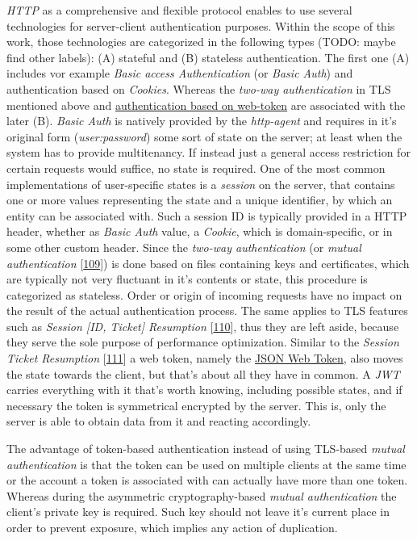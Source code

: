 \documentclass[12pt,english,a4paper,titlepage,cleardoublepage=empty,dottedtoc]{report}
\begin{document}
\emph{HTTP} as a comprehensive and flexible protocol enables to use
several technologies for server-client authentication purposes. Within
the scope of this work, those technologies are categorized in the
following types (TODO: maybe find other labels): (A) stateful and (B)
stateless authentication. The first one (A) includes vor example
\emph{Basic access Authentication} (or \emph{Basic Auth}) and
authentication based on \emph{Cookies}. Whereas the \emph{two-way
authentication} in TLS mentioned above and
\protect\hyperlink{link_jwt}{authentication based on web-token} are
associated with the later (B). \emph{Basic Auth} is natively provided by
the \emph{http-agent} and requires in it's original form
(\emph{user:password}) some sort of state on the server; at least when
the system has to provide multitenancy. If instead just a general access
restriction for certain requests would suffice, no state is required.
One of the most common implementations of user-specific states is a
\emph{session} on the server, that contains one or more values
representing the state and a unique identifier, by which an entity can
be associated with. Such a session ID is typically provided in a HTTP
header, whether as \emph{Basic Auth} value, a \emph{Cookie}, which is
domain-specific, or in some other custom header. Since the \emph{two-way
authentication} (or \emph{mutual authentication}
{[}\protect\hyperlink{ref-web_2017_wikipedia_mutual-auth}{109}{]}) is
done based on files containing keys and certificates, which are
typically not very fluctuant in it's contents or state, this procedure
is categorized as stateless. Order or origin of incoming requests have
no impact on the result of the actual authentication process. The same
applies to TLS features such as \emph{Session {[}ID, Ticket{]}
Resumption}
{[}\protect\hyperlink{ref-book_2013_networking-101_tls-session-resumption}{110}{]},
thus they are left aside, because they serve the sole purpose of
performance optimization. Similar to the \emph{Session Ticket
Resumption}
{[}\protect\hyperlink{ref-web_spec_tls-session-ticket-resumption}{111}{]}
a web token, namely the \protect\hyperlink{link_jwt}{JSON Web Token},
also moves the state towards the client, but that's about all they have
in common. A \emph{JWT} carries everything with it that's worth knowing,
including possible states, and if necessary the token is symmetrical
encrypted by the server. This is, only the server is able to obtain data
from it and reacting accordingly.

The advantage of token-based authentication instead of using TLS-based
\emph{mutual authentication} is that the token can be used on multiple
clients at the same time or the account a token is associated with can
actually have more than one token. Whereas during the asymmetric
cryptography-based \emph{mutual authentication} the client's private key
is required. Such key should not leave it's current place in order to
prevent exposure, which implies any action of duplication.
\end{document}
